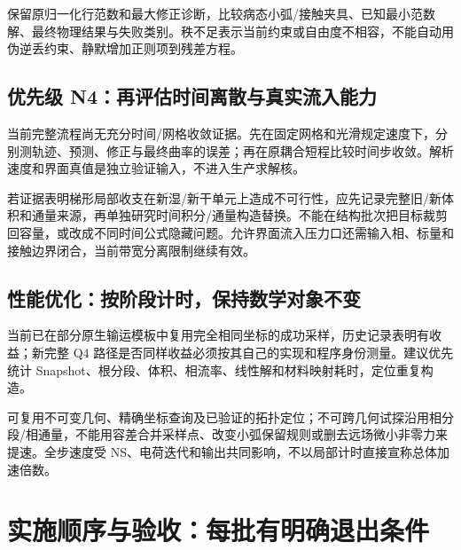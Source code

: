 \documentclass[UTF8,a4paper,11pt,fontset=fandol]{ctexart}
\begin{document}
保留原归一化行范数和最大修正诊断，比较病态小弧/接触夹具、已知最小范数解、最终物理结果与失败类别。秩不足表示当前约束或自由度不相容，不能自动用伪逆丢约束、静默增加正则项到残差方程。

\subsection{优先级 N4：再评估时间离散与真实流入能力}
当前完整流程尚无充分时间/网格收敛证据。先在固定网格和光滑规定速度下，分别测轨迹、预测、修正与最终曲率的误差；再在原耦合短程比较时间步收敛。解析速度和界面真值是独立验证输入，不进入生产求解核。

若证据表明梯形局部收支在新湿/新干单元上造成不可行性，应先记录完整旧/新体积和通量来源，再单独研究时间积分/通量构造替换。不能在结构批次把目标裁剪回容量，或改成不同时间公式隐藏问题。允许界面流入压力口还需输入相、标量和接触边界闭合，当前带宽分离限制继续有效。

\subsection{性能优化：按阶段计时，保持数学对象不变}
当前已在部分原生输运模板中复用完全相同坐标的成功采样，历史记录表明有收益；新完整 Q4 路径是否同样收益必须按其自己的实现和程序身份测量。建议优先统计 Snapshot、根分段、体积、相流率、线性解和材料映射耗时，定位重复构造。

可复用不可变几何、精确坐标查询及已验证的拓扑定位；不可跨几何试探沿用相分段/相通量，不能用容差合并采样点、改变小弧保留规则或删去远场微小非零力来提速。全步速度受 NS、电荷迭代和输出共同影响，不以局部计时直接宣称总体加速倍数。

\section{实施顺序与验收：每批有明确退出条件}
\end{document}
